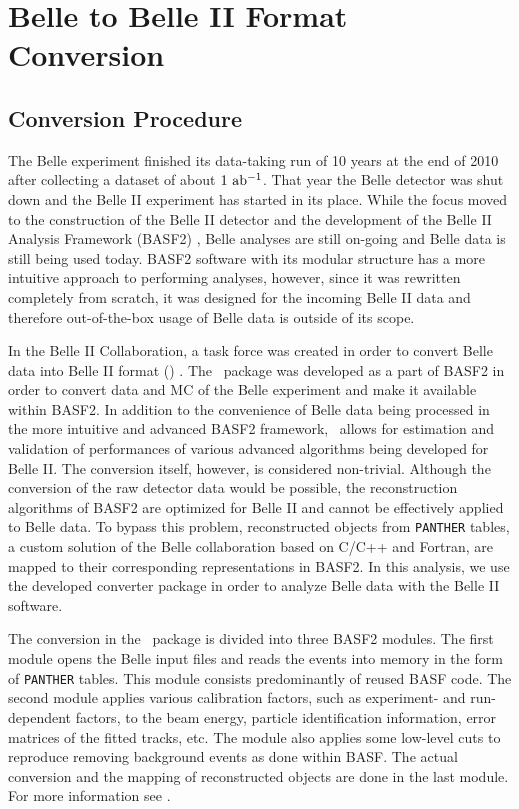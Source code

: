\chapter{Belle to Belle II Format Conversion}

\section{Conversion Procedure}
The Belle experiment finished its data-taking run of 10 years at the end of 2010 after collecting a dataset of about $1\mathrm{~ab^{-1}}$. That year the Belle detector was shut down and the Belle II experiment has started in its place. While the focus moved to the construction of the Belle II detector and the development of the Belle II Analysis Framework (BASF2) \cite{Kuhr:2018lps}, Belle analyses are still on-going and Belle data is still being used today. BASF2 software with its modular structure has a more intuitive approach to performing analyses, however, since it was rewritten completely from scratch, it was designed for the incoming Belle II data and therefore out-of-the-box usage of Belle data is outside of its scope.

In the Belle II Collaboration, a task force was created in order to convert Belle data into Belle II format (\btbii) \cite{Keck:b2bii2018}. The \btbii~package was developed as a part of BASF2 in order to convert data and MC of the Belle experiment and make it available within BASF2. In addition to the convenience of Belle data being processed in the more intuitive and advanced BASF2 framework, \btbii~allows for estimation and validation of performances of various advanced algorithms being developed for Belle II. The conversion itself, however, is considered non-trivial. Although the conversion of the raw detector data would be possible, the reconstruction algorithms of BASF2 are optimized for Belle II and cannot be effectively applied to Belle data. To bypass this problem, reconstructed objects from \texttt{PANTHER} tables, a custom solution of the Belle collaboration based on C/C++ and Fortran, are mapped to their corresponding representations in BASF2. In this analysis, we use the developed converter package in order to analyze Belle data with the Belle II software.

The conversion in the \btbii~package is divided into three BASF2 modules. The first module opens the Belle input files and reads the events into memory in the form of \texttt{PANTHER} tables. This module consists predominantly of reused BASF code. The second module applies various calibration factors, such as experiment- and run-dependent factors, to the beam energy, particle identification information, error matrices of the fitted tracks, etc. The module also applies some low-level cuts to reproduce removing background events as done within BASF. The actual conversion and the mapping of reconstructed objects are done in the last module. For more information see \cite{Keck:48940}.


